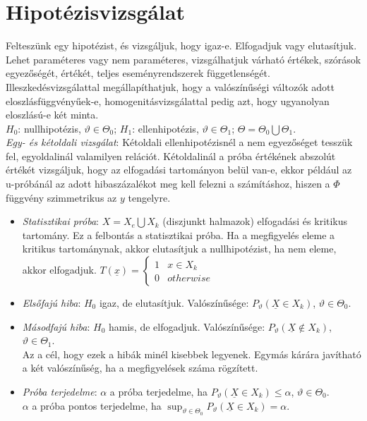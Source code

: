 \documentclass[tikz,12pt,margin=0px]{article}
\begin{document}
	\section*{Hipotézisvizsgálat}
	
	Felteszünk egy hipotézist, és vizsgáljuk, hogy igaz-e. Elfogadjuk vagy elutasítjuk. Lehet paraméteres vagy nem paraméteres, vizsgálhatjuk várható értékek, szórások egyezőségét, értékét, teljes eseményrendszerek függetlenségét. Illeszkedésvizsgálattal megállapíthatjuk, hogy a valószínűségi változók adott eloszlásfüggvényűek-e, homogenitásvizsgálattal pedig azt, hogy ugyanolyan eloszlású-e két minta. \\
	$H_0$: nullhipotézis, $\vartheta \in \Theta_0$; $H_1$: ellenhipotézis, $\vartheta \in \Theta_1$; $\Theta = \Theta_0 \bigcup \Theta_1$. \\
	\textit{Egy- és kétoldali vizsgálat}: Kétoldali ellenhipotézisnél a nem egyezőséget tesszük fel, egyoldalinál valamilyen relációt. Kétoldalinál a próba értékének abszolút értékét vizsgáljuk, hogy az elfogadási tartományon belül van-e, ekkor például az u-próbánál az adott hibaszázalékot meg kell felezni a számításhoz, hiszen a $\Phi$ függvény szimmetrikus az $y$ tengelyre.
	\begin{itemize}
	\item \textit{Statisztikai próba}: $X = X_e \bigcup X_k$ (diszjunkt halmazok) elfogadási és kritikus tartomány. Ez a felbontás a statisztikai próba. Ha a megfigyelés eleme a kritikus tartománynak, akkor elutasítjuk a nullhipotézist, ha nem eleme, akkor elfogadjuk. $T(\underline{x}) = \left\{\begin{array} {lr} 1 & x \in X_k \\ 0 & otherwise \end{array}\right.$
	\item \textit{Elsőfajú hiba}: $H_0$ igaz, de elutasítjuk. Valószínűsége: $P_{\vartheta}(\underline{X} \in X_k)$, $\vartheta \in \Theta_0$.
	\item \textit{Másodfajú hiba}: $H_0$ hamis, de elfogadjuk. Valószínűsége: $P_{\vartheta}(\underline{X} \notin X_k)$, $\vartheta \in \Theta_1$. \\
	Az a cél, hogy ezek a hibák minél kisebbek legyenek. Egymás kárára javítható a két valószínűség, ha a megfigyelések száma rögzített.
	\item \textit{Próba terjedelme}: $\alpha$ a próba terjedelme, ha $P_{\vartheta}(\underline{X} \in X_k) \leq \alpha$, $\vartheta \in \Theta_0$. \\
	$\alpha$ a próba pontos terjedelme, ha $\sup_{\vartheta \in \Theta_0}{P_{\vartheta}(\underline{X} \in X_k) = \alpha}$.
	\end{itemize}
	
\end{document}
